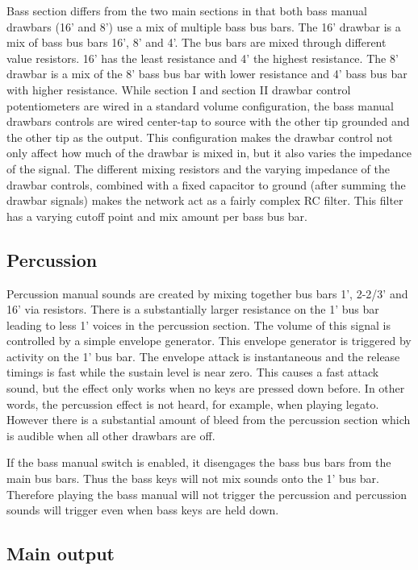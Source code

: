\documentclass[11pt,a4paper]{article}
\begin{document}
Bass section differs from the two main sections in that both bass manual drawbars (16' and 8') use a mix of multiple bass bus bars. The 16' drawbar is a mix of bass bus bars 16', 8' and 4'. The bus bars are mixed through different value resistors. 16' has the least resistance and 4' the highest resistance. The 8' drawbar is a mix of the 8' bass bus bar with lower resistance and 4' bass bus bar with higher resistance. While section I and section II drawbar control potentiometers are wired in a standard volume configuration, the bass manual drawbars controls are wired center-tap to source with the other tip grounded and the other tip as the output. This configuration makes the drawbar control not only affect how much of the drawbar is mixed in, but it also varies the impedance of the signal. The different mixing resistors and the varying impedance of the drawbar controls, combined with a fixed capacitor to ground (after summing the drawbar signals) makes the network act as a fairly complex RC filter. This filter has a varying cutoff point and mix amount per bass bus bar.

\subsection{Percussion}

Percussion manual sounds are created by mixing together bus bars 1', 2-2/3' and 16' via resistors. There is a substantially larger resistance on the 1' bus bar leading to less 1' voices in the percussion section. The volume of this signal is controlled by a simple envelope generator. This envelope generator is triggered by activity on the 1' bus bar. The envelope attack is instantaneous and the release timings is fast while the sustain level is near zero. This causes a fast attack sound, but the effect only works when no keys are pressed down before. In other words, the percussion effect is not heard, for example, when playing legato. However there is a substantial amount of bleed from the percussion section which is audible when all other drawbars are off.

If the bass manual switch is enabled, it disengages the bass bus bars from the main bus bars. Thus the bass keys will not mix sounds onto the 1' bus bar. Therefore playing the bass manual will not trigger the percussion and percussion sounds will trigger even when bass keys are held down.

\subsection{Main output}
\end{document}
